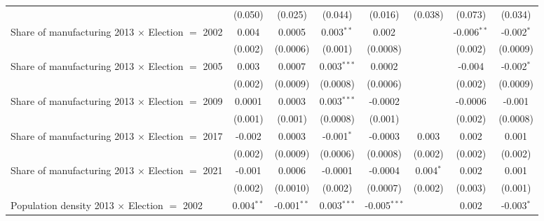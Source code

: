 \begin{table}[htbp]
\begin{tabular}{lccccccc}
                                                              & (0.050)        & (0.025)        & (0.044)                & (0.016)        & (0.038)        & (0.073)        & (0.034)\\   
      Share of manufacturing 2013 $\times$ Election $=$ 2002  & 0.004          & 0.0005         & 0.003$^{**}$           & 0.002          &                & -0.006$^{**}$  & -0.002$^{*}$\\   
                                                              & (0.002)        & (0.0006)       & (0.001)                & (0.0008)       &                & (0.002)        & (0.0009)\\   
      Share of manufacturing 2013 $\times$ Election $=$ 2005  & 0.003          & 0.0007         & 0.003$^{***}$          & 0.0002         &                & -0.004         & -0.002$^{*}$\\   
                                                              & (0.002)        & (0.0009)       & (0.0008)               & (0.0006)       &                & (0.002)        & (0.0009)\\   
      Share of manufacturing 2013 $\times$ Election $=$ 2009  & 0.0001         & 0.0003         & 0.003$^{***}$          & -0.0002        &                & -0.0006        & -0.001\\   
                                                              & (0.001)        & (0.001)        & (0.0008)               & (0.001)        &                & (0.002)        & (0.0008)\\   
      Share of manufacturing 2013 $\times$ Election $=$ 2017  & -0.002         & 0.0003         & -0.001$^{*}$           & -0.0003        & 0.003          & 0.002          & 0.001\\   
                                                              & (0.002)        & (0.0009)       & (0.0006)               & (0.0008)       & (0.002)        & (0.002)        & (0.002)\\   
      Share of manufacturing 2013 $\times$ Election $=$ 2021  & -0.001         & 0.0006         & -0.0001                & -0.0004        & 0.004$^{*}$    & 0.002          & 0.001\\   
                                                              & (0.002)        & (0.0010)       & (0.002)                & (0.0007)       & (0.002)        & (0.003)        & (0.001)\\   
      Population density 2013 $\times$ Election $=$ 2002      & 0.004$^{**}$   & -0.001$^{**}$  & 0.003$^{***}$          & -0.005$^{***}$ &                & 0.002          & -0.003$^{*}$\\   

\end{tabular}
\end{table}
